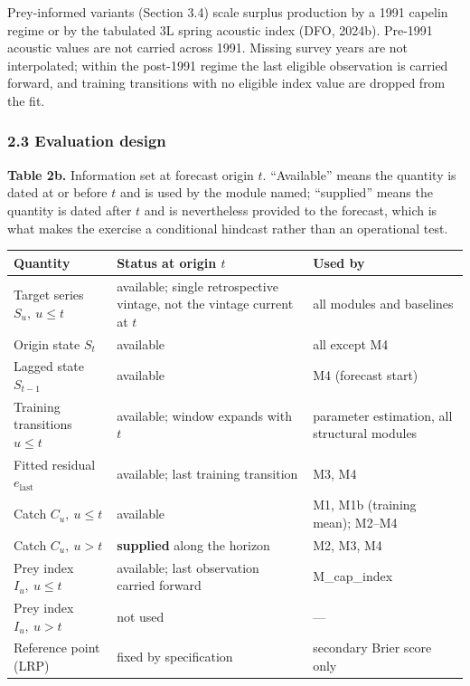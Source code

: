 \documentclass[11pt]{article}
\begin{document}
Prey-informed variants (Section 3.4) scale surplus production by a 1991
capelin regime or by the tabulated 3L spring acoustic index (DFO,
2024b). Pre-1991 acoustic values are not carried across 1991. Missing
survey years are not interpolated; within the post-1991 regime the last
eligible observation is carried forward, and training transitions with
no eligible index value are dropped from the fit.

\subsubsection{2.3 Evaluation design}\label{evaluation-design}

\textbf{Table 2b.} Information set at forecast origin \(t\). ``Available''
means the quantity is dated at or before \(t\) and is used by the module
named; ``supplied'' means the quantity is dated after \(t\) and is
nevertheless provided to the forecast, which is what makes the exercise a
conditional hindcast rather than an operational test.

\begin{longtable}[]{@{}
  >{\raggedright\arraybackslash}p{}
  >{\raggedright\arraybackslash}p{}
  >{\raggedright\arraybackslash}p{}@{}}
\toprule\noalign{}
Quantity & Status at origin \(t\) & Used by \\
\midrule\noalign{}
\endhead
\bottomrule\noalign{}
\endlastfoot
Target series \(S_u,\ u\le t\) & available; single retrospective vintage, not the vintage current at \(t\) & all modules and baselines \\
Origin state \(S_t\) & available & all except M4 \\
Lagged state \(S_{t-1}\) & available & M4 (forecast start) \\
Training transitions \(u\le t\) & available; window expands with \(t\) & parameter estimation, all structural modules \\
Fitted residual \(e_{\mathrm{last}}\) & available; last training transition & M3, M4 \\
Catch \(C_u,\ u\le t\) & available & M1, M1b (training mean); M2--M4 \\
Catch \(C_u,\ u>t\) & \textbf{supplied} along the horizon & M2, M3, M4 \\
Prey index \(I_u,\ u\le t\) & available; last observation carried forward & M\_cap\_index \\
Prey index \(I_u,\ u>t\) & not used & --- \\
Reference point (LRP) & fixed by specification & secondary Brier score only \\
\end{longtable}
\end{document}
